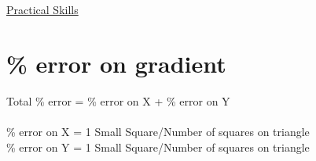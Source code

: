 \documentclass{article}[18pt]
\begin{document}
\begin{center}
\underline{\huge Practical Skills}
\end{center}
\section{\% error on gradient}
Total \% error = \% error on X + \% error on Y\\
\\
\% error on X = 1 Small Square/Number of squares on triangle\\
\% error on Y = 1 Small Square/Number of squares on triangle\\
\end{document}
